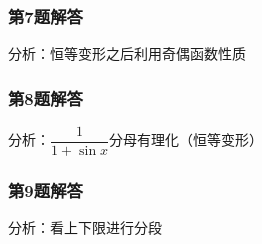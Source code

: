 \documentclass[./book.tex]{subfiles}
\begin{document}
    \subsubsection*{第7题解答}
    \begin{analysisbox}
        分析：恒等变形之后利用奇偶函数性质
    \end{analysisbox}

    \subsubsection*{第8题解答}
    \begin{analysisbox}
        分析：$\dfrac{1}{1+\sin x}$分母有理化（恒等变形）
    \end{analysisbox}

    \subsubsection*{第9题解答}
    \begin{analysisbox}
        分析：看上下限进行分段
    \end{analysisbox}
\end{document}
